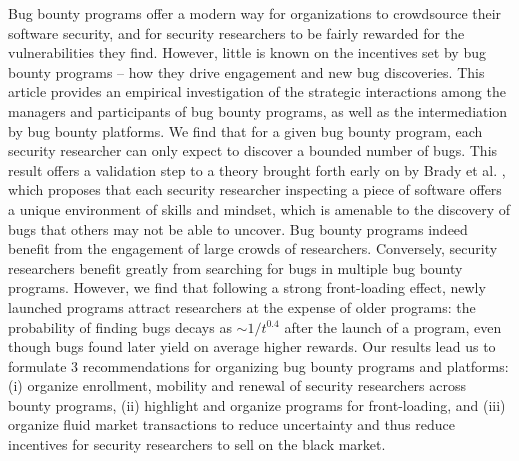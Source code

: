 Bug bounty programs offer a modern way for organizations to crowdsource their software security, and for security researchers to be fairly rewarded for the vulnerabilities they find. However, little is known on the incentives set by bug bounty programs -- how they drive engagement and new bug discoveries. This article provides an empirical investigation of the strategic interactions among the managers and participants of bug bounty programs, as well as the intermediation by bug bounty platforms. We find that for a given bug bounty program, each security researcher can only expect to discover a bounded number of bugs. This result offers a validation step to a theory brought forth early on by Brady et al. \cite{brady1999murphy}, which proposes that each security researcher inspecting a piece of software offers a unique environment of skills and mindset, which is amenable to the discovery of bugs that others may not be able to uncover. Bug bounty programs indeed benefit from the engagement of large crowds of researchers. Conversely, security researchers benefit greatly from searching for bugs in multiple bug bounty programs. However, we find that following a strong front-loading effect, newly launched programs attract researchers at the expense of older programs: the probability of finding bugs decays as $\sim 1/t^{0.4}$ after the launch of a program, even though bugs found later yield on average higher rewards. Our results lead us to formulate 3 recommendations for organizing bug bounty programs and platforms: (i) organize enrollment, mobility and renewal of security researchers across bounty programs, (ii) highlight and organize programs for front-loading, and (iii) organize fluid market transactions to reduce uncertainty and thus reduce incentives for security researchers to sell on the black market.



